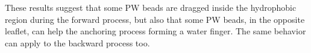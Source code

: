 These results suggest that some \ac{PW} beads are dragged inside the hydrophobic region during the forward process, but also that some \ac{PW} beads, in the opposite leaflet, can help the anchoring process forming a water finger. The same behavior can apply to the backward process too.
 

